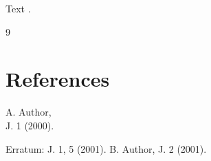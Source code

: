 \documentclass{article}
\begin{document}
Text \cite{a,b}.
\begin{thebibliography}{9}
\section*{References}
 A. Author,\\ J. 1 (2000).

Erratum: J. 1, 5 (2001).
 B. Author, J. 2 (2001).
\end{thebibliography}
\end{document}

